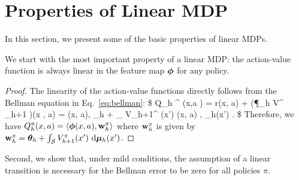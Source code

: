 

\section{Properties of Linear MDP} \label{sec:properties}


In this section, we present some of the basic properties of linear MDPs.


We start with the most important property of a linear MDP: the action-value function is always linear in the feature map $\bm{\phi}$ for any policy.

\PROPrealizable*

\begin{proof}
The linearity of the action-value functions directly follows from the Bellman equation in Eq.~\eqref{eq:bellman}:   
\$
Q_h ^{\pi} (x,a ) = r(x, a) + (\P_h V^{\pi} _{h+1}  )(x , a) = \la \bphi(x, a), \btheta_h \ra + \int_{\cS} V_{h+1}^{\pi} (x') \cdot \la \bphi(x, a) , \ud \bmu_h(x') \ra  .  
  \$
Therefore, we have $ Q_h^\pi(x, a) = \langle\bm{\phi} (x, a),  \mathbf{w}^{\pi}_h\rangle$ where $\mathbf{w}_h^{\pi}$ is given by $\mathbf{w}_h^{\pi} = \bm{\theta}_h + \int_{\mathcal{S}} V_{h+1}^{\pi} (x' ) ~{\mathrm{d}} \bm{\mu}_h(x')$.
\end{proof}





Second, we show that, under mild conditions, the assumption of a linear transition is necessary for the Bellman error to be zero for all policies $\pi$.

\PROPbellmanerror*

